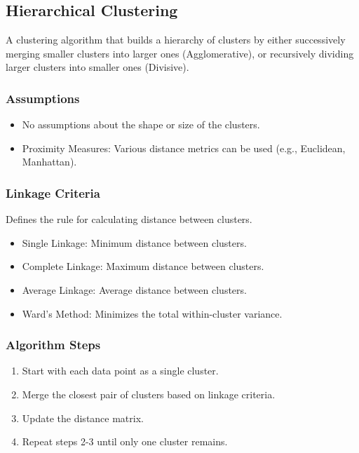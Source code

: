 \documentclass[english, threecolumn]{latex4ei/latex4ei_sheet}
\begin{document}
\begin{sectionbox}
\subsection{Hierarchical Clustering}
A clustering algorithm that builds a hierarchy of clusters by either successively merging smaller clusters into larger ones (Agglomerative), or recursively dividing larger clusters into smaller ones (Divisive).

\subsubsection{Assumptions}
\begin{itemize}
    \item No assumptions about the shape or size of the clusters.
    \item Proximity Measures: Various distance metrics can be used (e.g., Euclidean, Manhattan).
\end{itemize}

\subsubsection{Linkage Criteria}
Defines the rule for calculating distance between clusters.
\begin{itemize}
    \item Single Linkage: Minimum distance between clusters.
    \item Complete Linkage: Maximum distance between clusters.
    \item Average Linkage: Average distance between clusters.
    \item Ward's Method: Minimizes the total within-cluster variance.
\end{itemize}

\subsubsection{Algorithm Steps}
\begin{enumerate}
    \item Start with each data point as a single cluster.
    \item Merge the closest pair of clusters based on linkage criteria.
    \item Update the distance matrix.
    \item Repeat steps 2-3 until only one cluster remains.
\end{enumerate}


\end{sectionbox}
\end{document}
